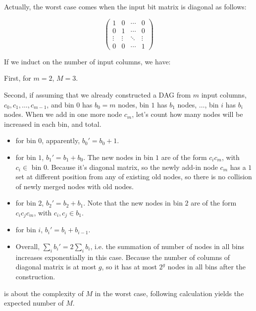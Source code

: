 \begin{IEEEproof}
Actually, the worst case comes when the input bit matrix is diagonal 
as follows: 

\[
\begin{pmatrix}
1 & 0 & \cdots & 0 \\
0 & 1 & \cdots & 0 \\
\vdots & \vdots & \ddots & \vdots \\
0 & 0 & \cdots & 1
\end{pmatrix}
\]

If we induct on the number of input columns, we have:

First, for $m = 2$, $M = 3$. 

Second, if assuming that we already constructed a {DAG} from $m$
input columns, $c_0, c_1, \ldots, c_{m-1}$, and bin $0$ has $b_0 = m$
nodes, bin $1$ has $b_1$ nodes, $\ldots$, bin $i$ has $b_i$ nodes. When we
add in one more node $c_m$, let's count how many nodes will be increased
in each bin, and total.

\begin{itemize}

\item for bin $0$, apparently, $b_0' = b_0 + 1$. 

\item for bin $1$, $b_1' = b_1 + b_0$. The new nodes in bin $1$ are of
the form $c_i c_m$, with $c_i \in$ bin $0$. Because it's diagonal matrix,
so the newly add-in node $c_m$ has a $1$ set at different position from
any of existing old nodes, so there is no collision of newly merged nodes
with old nodes.

\item for bin $2$, $b_2' = b_2 + b_1$. Note that the new nodes in bin $2$ 
are of the form $c_i c_j c_m$, with $c_i, c_j \in b_1$.

\item for bin $i$, $b_i' = b_i + b_{i-1}$.

\item Overall, $\sum_i b_i' = 2 \sum_i b_i$, i.e. the summation of number
of nodes in all bins increases exponentially in this case. Because the
number of columns of diagonal matrix is at most $g$, so it has at most
$2^g$ nodes in all bins after the construction.

\end{itemize}
\end{IEEEproof}

 is about the complexity of $M$ in the worst case,
following calculation yields the expected number of $M$.

